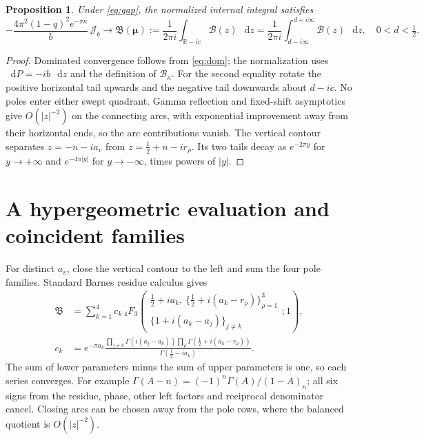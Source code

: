 \documentclass[11pt,a4paper]{article}
\newtheorem{proposition}{Proposition}
\newcommand{\dd}{\mathop{}\!\mathrm d}
\begin{document}
\begin{proposition}
Under \eqref{eq:gap}, the normalized internal integral satisfies
\begin{equation}
 -\frac{4\pi^2(1-q)^2e^{-\pi\kappa}}{b}\,\mathcal J_b
 \longrightarrow
 \mathfrak B(\boldsymbol\mu):=
 \frac1{2\pi i}\int_{\mathbb R-ic}\mathcal B(z)\,\dd z
 =\frac1{2\pi i}\int_{d-i\infty}^{d+i\infty}\mathcal B(z)\,\dd z,
 \quad 0<d<\tfrac12. \label{eq:limit}
\end{equation}
\end{proposition}
\begin{proof}
Dominated convergence follows from \eqref{eq:dom}; the normalization
uses \(\dd P=-ib\,\dd z\) and the definition of \(\mathcal B_\kappa\).
For the second equality rotate the positive horizontal tail upwards
and the negative tail downwards about \(d-ic\). No poles enter either
swept quadrant. Gamma reflection and fixed-shift asymptotics give
\(O(|z|^{-2})\) on the connecting arcs, with exponential improvement
away from their horizontal ends, so the arc contributions vanish.
The vertical contour separates \(z=-n-ia_v\) from
\(z=\frac12+n-ir_\rho\). Its two tails decay as
\(e^{-2\pi y}\) for \(y\to+\infty\) and \(e^{-4\pi|y|}\) for
\(y\to-\infty\), times powers of \(|y|\).
\end{proof}

\section{A hypergeometric evaluation and coincident families}
For distinct \(a_v\), close the vertical contour to the left and
sum the four pole families. Standard Barnes residue calculus
\cite{DLMFb} gives
\begin{align}
 \mathfrak B&=\sum_{k=1}^4 c_k\,
 {}_4F_3\left(
 \begin{matrix}
 \frac12+ia_k,\ \{\frac12+i(a_k-r_\rho)\}_{\rho=1}^3\\
 \{1+i(a_k-a_j)\}_{j\ne k}
 \end{matrix};1\right), \label{eq:hyper}\\
 c_k&=e^{-\pi a_k}
 \frac{\prod_{j\ne k}\Gamma(i(a_j-a_k))
       \prod_\rho\Gamma(\frac12+i(a_k-r_\rho))}
      {\Gamma(\frac12-ia_k)}.
\end{align}
The sum of lower parameters minus the sum of upper parameters is one,
so each series converges. For example
\(\Gamma(A-n)=(-1)^n\Gamma(A)/(1-A)_n\);
all six signs from the residue, phase, other left factors and
reciprocal denominator cancel. Closing arcs can be chosen away from
the pole rows, where the balanced quotient is \(O(|z|^{-2})\).
\end{document}
